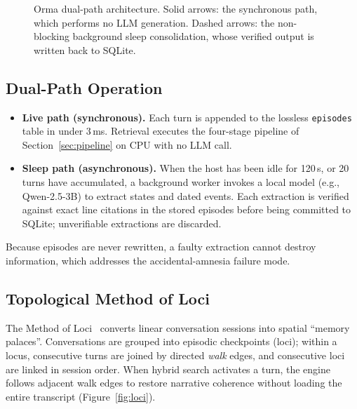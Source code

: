 \documentclass[11pt]{article}
\newcommand{\orma}{\mbox{Orma}}
\begin{document}
\begin{figure}[t]
\caption{\orma{} dual-path architecture. Solid arrows: the synchronous path, which performs no LLM generation. Dashed arrows: the non-blocking background sleep consolidation, whose verified output is written back to SQLite.}
\label{fig:arch}
\end{figure}

\subsection{Dual-Path Operation}
\begin{itemize}
    \item \textbf{Live path (synchronous).} Each turn is appended to the lossless \texttt{episodes} table in under 3\,ms. Retrieval executes the four-stage pipeline of Section~\ref{sec:pipeline} on CPU with no LLM call.
    \item \textbf{Sleep path (asynchronous).} When the host has been idle for 120\,s, or 20 turns have accumulated, a background worker invokes a local model (e.g., Qwen-2.5-3B) to extract states and dated events. Each extraction is verified against exact line citations in the stored episodes before being committed to SQLite; unverifiable extractions are discarded.
\end{itemize}
Because episodes are never rewritten, a faulty extraction cannot destroy information, which addresses the accidental-amnesia failure mode.

\subsection{Topological Method of Loci}
\label{sec:loci}
The Method of Loci~\cite{yates1966art} converts linear conversation sessions into spatial ``memory palaces''.
Conversations are grouped into episodic checkpoints (loci); within a locus, consecutive turns are joined by directed \emph{walk} edges, and consecutive loci are linked in session order.
When hybrid search activates a turn, the engine follows adjacent walk edges to restore narrative coherence without loading the entire transcript (Figure~\ref{fig:loci}).
\end{document}
